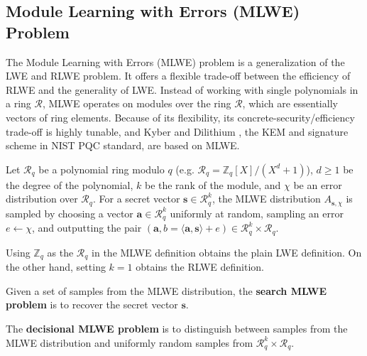 \subsection{Module Learning with Errors (MLWE) Problem} 
The Module Learning with Errors (MLWE) problem \cite{BGV} \cite{mlwe} is a generalization of the LWE and RLWE problem. It offers a flexible trade-off between the efficiency of RLWE and the generality of LWE. Instead of working with single polynomials in a ring $\mathcal{R}$, MLWE operates on modules over the ring $\mathcal{R}$, which are essentially vectors of ring elements. Because of its flexibility, its concrete-security/efficiency trade-off is highly tunable, and Kyber and Dilithium \cite{kyber, dilithium}, the KEM and signature scheme in NIST PQC standard, are based on MLWE.
\begin{definition}
Let $\mathcal{R}_q$ be a polynomial ring modulo $q$ (e.g. $\mathcal{R}_q = \mathbb{Z}_q[X]/(X^d + 1)$), $d \ge 1$ be the degree of the polynomial, $k$ be the rank of the module, and $\chi$ be an error distribution over $\mathcal{R}_q$. For a secret vector $\mathbf{s} \in \mathcal{R}_q^k$, the MLWE distribution $A_{\mathbf{s}, \chi}$ is sampled by choosing a vector $\mathbf{a} \in \mathcal{R}_q^k$ uniformly at random, sampling an error $e \leftarrow \chi$, and outputting the pair $(\mathbf{a}, b = \langle \mathbf{a}, \mathbf{s} \rangle + e) \in \mathcal{R}_q^k \times \mathcal{R}_q$.
\end{definition}
\noindent Using $\mathbb{Z}_q$ as the $\mathcal{R}_q$ in the MLWE definition obtains the plain LWE definition. On the other hand, setting $k=1$ obtains the RLWE definition.
\begin{definition}
Given a set of samples from the MLWE distribution, the \textbf{search MLWE problem} is to recover the secret vector $\mathbf{s}$.
\end{definition}

\begin{definition}
The \textbf{decisional MLWE problem} is to distinguish between samples from the MLWE distribution and uniformly random samples from $\mathcal{R}_q^k \times \mathcal{R}_q$.
\end{definition}

